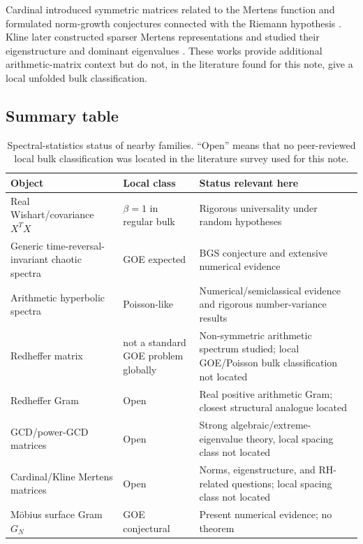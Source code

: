 \documentclass[11pt]{amsart}
\numberwithin{equation}{section}
\theoremstyle{plain}
\theoremstyle{definition}
\theoremstyle{remark}
\begin{document}
Cardinal introduced symmetric matrices related to the Mertens function and formulated norm-growth conjectures connected with the Riemann hypothesis \cite{Cardinal2010}.  Kline later constructed sparser Mertens representations and studied their eigenstructure and dominant eigenvalues \cite{Kline2019,Kline2020}.  These works provide additional arithmetic-matrix context but do not, in the literature found for this note, give a local unfolded bulk classification.

\subsection{Summary table}
\label{subsec:literature_table}

\begin{table}[htbp]
\centering
\caption{Spectral-statistics status of nearby families.  ``Open'' means that no peer-reviewed local bulk classification was located in the literature survey used for this note.}
\label{tab:literature_status}
\begin{tabular}{p{}p{}p{}}
\toprule
Object & Local class & Status relevant here\\
\midrule
Real Wishart/covariance $X^TX$ & $\beta=1$ in regular bulk & Rigorous universality under random hypotheses \cite{TaoVu2012,PillaiYin2014}\\
Generic time-reversal-invariant chaotic spectra & GOE expected & BGS conjecture and extensive numerical evidence \cite{BGS1984}\\
Arithmetic hyperbolic spectra & Poisson-like & Numerical/semiclassical evidence and rigorous number-variance results \cite{BogomolnyEtAl1992,LuoSarnak1994}\\
Redheffer matrix & not a standard GOE problem globally & Non-symmetric arithmetic spectrum studied; local GOE/Poisson bulk classification not located \cite{BarrettJarvis1992}\\
Redheffer Gram & Open & Real positive arithmetic Gram; closest structural analogue located \cite{ClementSteinerberger2025}\\
GCD/power-GCD matrices & Open & Strong algebraic/extreme-eigenvalue theory, local spacing class not located \cite{HongLoewy2004}\\
Cardinal/Kline Mertens matrices & Open & Norms, eigenstructure, and RH-related questions; local spacing class not located \cite{Cardinal2010,Kline2019,Kline2020}\\
M\"obius surface Gram $G_N$ & GOE conjectural & Present numerical evidence; no theorem\\
\bottomrule
\end{tabular}
\end{table}
\end{document}
